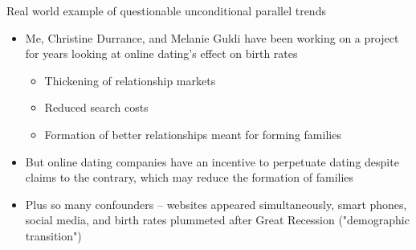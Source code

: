 \documentclass{beamer}
\begin{document}
\begin{frame}{Real world example of questionable unconditional parallel trends}

\begin{itemize}
\item Me, Christine Durrance, and Melanie Guldi have been working on a project for years looking at online dating's effect on birth rates
	\begin{itemize}
	\item Thickening of relationship markets
	\item Reduced search costs
	\item Formation of better relationships meant for forming families
	\end{itemize}
\item But online dating companies have an incentive to perpetuate dating despite claims to the contrary, which may reduce the formation of families
\item Plus so many confounders -- websites appeared simultaneously, smart phones, social media, and birth rates plummeted after Great Recession ("demographic transition")
\end{itemize}
\end{frame}
\end{document}
